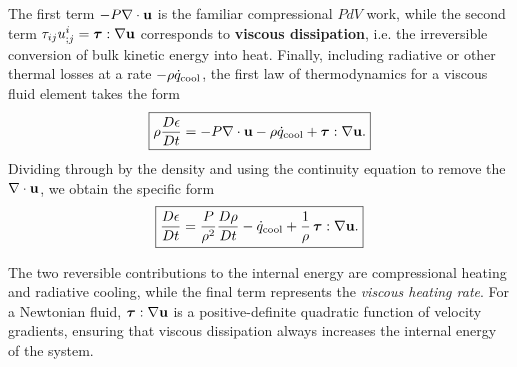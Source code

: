The first term $-P\nabla \cdot {\bf u}$ is the familiar compressional $PdV$ work, while the second term $\tau_{ij} u^i_{;j} = \boldsymbol{\tau} : \nabla {\bf u}$ corresponds to \textbf{viscous dissipation}, i.e. the irreversible conversion of bulk kinetic energy into heat.
\vspace{0.25cm}
\noindent
Finally, including radiative or other thermal losses at a rate $-\rho \dot{q}_{\rm cool}$,
the first law of thermodynamics for a viscous fluid element takes the form
\begin{equation}
\boxed{
\rho \frac{D\epsilon}{Dt} = -P \nabla \cdot {\bf u} - \rho \dot{q}_{\rm cool} 
+ \boldsymbol{\tau} : \nabla {\bf u}.
}
\end{equation}
Dividing through by the density and using the continuity equation to remove the $\nabla \cdot {\bf u}$, we obtain the specific form
\begin{equation}
\boxed{
\frac{D\epsilon}{Dt} = \frac{P}{\rho^2}\frac{D\rho}{Dt} - \dot{q}_{\rm cool}
+ \frac{1}{\rho}\, \boldsymbol{\tau} : \nabla {\bf u}.
}
\end{equation}
\begin{remark}
The two reversible contributions to the internal energy are compressional heating and
radiative cooling, while the final term represents the \emph{viscous heating rate}. For a
Newtonian fluid, $\boldsymbol{\tau} : \nabla {\bf u}$ is a positive-definite quadratic
function of velocity gradients, ensuring that viscous dissipation always increases the
internal energy of the system.
\end{remark}

